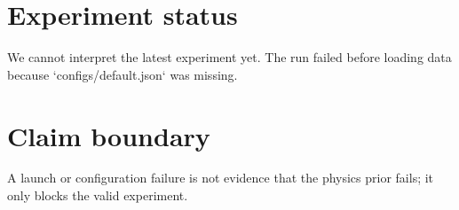 \section{Experiment status}
We cannot interpret the latest experiment yet. The run failed before loading data because `configs/default.json` was missing.

\section{Claim boundary}
A launch or configuration failure is not evidence that the physics prior fails; it only blocks the valid experiment.
